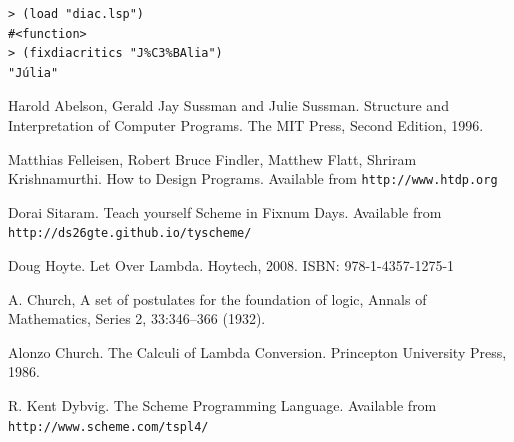 \documentclass[a4paper,12pt]{book}
\begin{document}
\begin{verbatim}
> (load "diac.lsp")
#<function>
> (fixdiacritics "J%C3%BAlia")
"Júlia"
\end{verbatim}
\begin{thebibliography}{99}


 Harold Abelson, Gerald Jay Sussman and
Julie Sussman. Structure and Interpretation of
Computer Programs. The MIT Press, Second Edition, 1996.

 Matthias Felleisen,
Robert Bruce Findler, Matthew Flatt, Shriram Krishnamurthi.
How to Design Programs.
Available from \verb|http://www.htdp.org|

 Dorai Sitaram. Teach yourself Scheme
in Fixnum Days. Available
from \verb|http://ds26gte.github.io/tyscheme/|

 Doug Hoyte. Let Over Lambda. Hoytech, 2008. ISBN: 978-1-4357-1275-1

 A. Church, A set of postulates for the foundation of logic, Annals of Mathematics, Series 2, 33:346–366 (1932).

 Alonzo Church. The Calculi of Lambda Conversion. Princepton University Press, 1986.

 R. Kent Dybvig. The Scheme Programming Language.
Available from \verb|http://www.scheme.com/tspl4/|

\end{thebibliography}

\printindex
\end{document}
